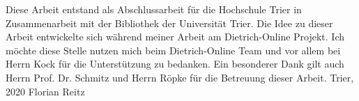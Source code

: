 \preface

Diese Arbeit entstand als Abschlussarbeit für die Hochschule Trier in Zusammenarbeit mit der Bibliothek der Universität Trier. 
\newline
\newline
Die Idee zu dieser Arbeit entwickelte sich während meiner Arbeit am Dietrich-Online Projekt. Ich möchte diese Stelle nutzen mich beim Dietrich-Online Team und vor allem bei Herrn Kock für die Unterstützung zu bedanken.
\newline
\newline
Ein besonderer Dank gilt auch Herrn Prof. Dr. Schmitz und Herrn Röpke für die Betreuung dieser Arbeit.
\newline
\newline
Trier, 2020
\newline
\noindent Florian Reitz